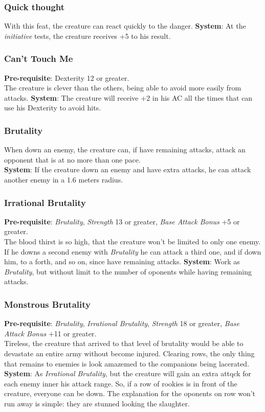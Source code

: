 \documentclass[ letterpaper,12pt]{article}
\begin{document}
\subsubsection{Quick thought}
With this feat, the creature can react quickly to the danger.
{\bf System}: At the {\it initiative} tests, the creature receives +5 to his result.

\subsubsection{Can't Touch Me}
{\bf Pre-requisite}: Dexterity 12 or greater.\\
The creature is clever than the others, being able to avoid more easily from attacks.
{\bf System}: The creature will receive +2 in his AC all the times that can use his Dexterity to avoid hits.

\subsubsection{Brutality}
When down an enemy, the creature can, if have remaining attacks, attack an opponent that is at no more than one pace.\\
{\bf System}: If the creature down an enemy and have extra attacks, he can attack another enemy in a 1.6 meters radius.

\subsubsection{Irrational Brutality}
{\bf Pre-requisite}: {\it Brutality}, {\it Strength} 13 or greater, {\it Base Attack Bonus} +5 or greater.\\
The blood thirst is so high, that the creature won't be limited to only one enemy. If he downs a second enemy with {\it Brutality} he can attack a third one, and if down him, to a forth, and so on, since have remaining attacks.
{\bf System}: Work as {\it Brutality}, but without limit to the number of oponents while having remaining attacks.

\subsubsection{Monstrous Brutality}
{\bf Pre-requisite}: {\it Brutality}, {\it Irrational Brutality}, {\it Strength} 18 or greater, {\it Base Attack Bonus} +11 or greater.\\
Tireless, the creature that arrived to that level of brutality would be able to devastate an entire army without become injured. Clearing rows, the only thing that remains to enemies is look amazemed to the companions being lacerated. \\
{\bf System}: As {\it Irrational Brutality}, but the creature will gain an extra attqck for each enemy inner his attack range. So, if a row of rookies is in front of the creature, everyone can be down. The explanation for the oponents on row won't run away is simple: they are stunned looking the slaughter.
\end{document}
